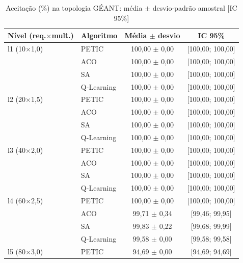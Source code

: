 \begin{table}[htb]
    \centering
    \small
    \caption{Aceitação (\%) na topologia GÉANT: média $\pm$ desvio-padrão amostral [IC 95\%]}
    \label{tab:aceitacao-geant}
    \begin{tabular}{llcc}
        \hline
        Nível (req.$\times$mult.) & Algoritmo & Média $\pm$ desvio & IC 95\% \\
        \hline
        l1 (10$\times$1,0) & PETIC & 100,00 $\pm$ 0,00 & [100,00; 100,00] \\
         & ACO & 100,00 $\pm$ 0,00 & [100,00; 100,00] \\
         & SA & 100,00 $\pm$ 0,00 & [100,00; 100,00] \\
         & Q-Learning & 100,00 $\pm$ 0,00 & [100,00; 100,00] \\
        \hline
        l2 (20$\times$1,5) & PETIC & 100,00 $\pm$ 0,00 & [100,00; 100,00] \\
         & ACO & 100,00 $\pm$ 0,00 & [100,00; 100,00] \\
         & SA & 100,00 $\pm$ 0,00 & [100,00; 100,00] \\
         & Q-Learning & 100,00 $\pm$ 0,00 & [100,00; 100,00] \\
        \hline
        l3 (40$\times$2,0) & PETIC & 100,00 $\pm$ 0,00 & [100,00; 100,00] \\
         & ACO & 100,00 $\pm$ 0,00 & [100,00; 100,00] \\
         & SA & 100,00 $\pm$ 0,00 & [100,00; 100,00] \\
         & Q-Learning & 100,00 $\pm$ 0,00 & [100,00; 100,00] \\
        \hline
        l4 (60$\times$2,5) & PETIC & 100,00 $\pm$ 0,00 & [100,00; 100,00] \\
         & ACO & 99,71 $\pm$ 0,34 & [99,46; 99,95] \\
         & SA & 99,83 $\pm$ 0,22 & [99,68; 99,99] \\
         & Q-Learning & 99,58 $\pm$ 0,00 & [99,58; 99,58] \\
        \hline
        l5 (80$\times$3,0) & PETIC & 94,69 $\pm$ 0,00 & [94,69; 94,69] \\

\end{tabular}
\end{table}
